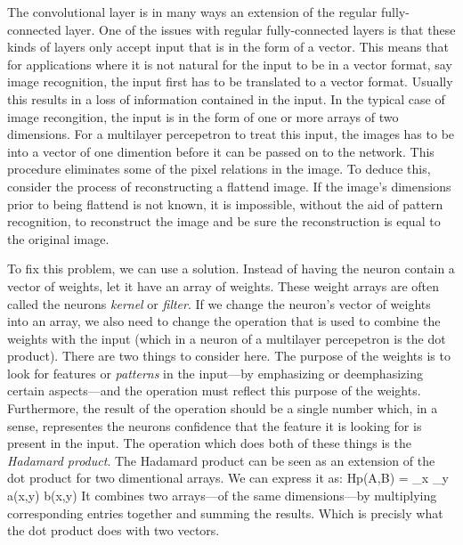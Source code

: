 The convolutional layer is in many ways an extension of the regular fully-connected layer.
One of the issues with regular fully-connected layers is that these kinds of layers only accept input that is in the form of a vector.
This means that for applications where it is not natural for the input to be in a vector format, say image recognition, the input first has to be translated to a vector format.
Usually this results in a loss of information contained in the input.
In the typical case of image recongition, the input is in the form of one or more arrays of two dimensions.
For a multilayer percepetron to treat this input, the images has to be  into a vector of one dimention before it can be passed on to the network.
This procedure eliminates some of the pixel relations in the image.
To deduce this, consider the process of reconstructing a flattend image.
If the image's dimensions prior to being flattend is not known, it is impossible, without the aid of pattern recognition, to reconstruct the image and be sure the reconstruction is equal to the original image.

To fix this problem, we can use a  solution.
Instead of having the neuron contain a vector of weights, let it have an array of weights.
These weight arrays are often called the neurons {\em kernel} or {\em filter}.
If we change the neuron's vector of weights into an array, we also need to change the operation that is used to combine the weights with the input (which in a neuron of a multilayer percepetron is the dot product).
There are two things to consider here.
The purpose of the weights is to look for features or {\em patterns} in the input---by emphasizing or deemphasizing certain aspects---and the operation must reflect this purpose of the weights.
Furthermore, the result of the operation should be a single number which, in a sense, representes the neurons  confidence that the feature it is looking for is present in the input.
The operation which does both of these things is the {\em Hadamard product}.
The Hadamard product can be seen as an extension of the dot product for two dimentional arrays.
We can express it as:
\startformula
{\rm Hp}(A,B) = \sum_{x} \sum_{y} a(x,y) b(x,y)
\stopformula
It combines two arrays---of the same dimensions---by multiplying corresponding entries together and summing the results.
Which is precisly what the dot product does with two vectors.

